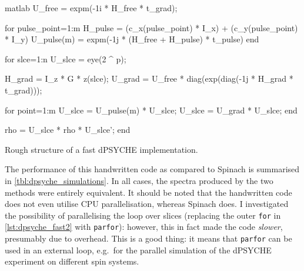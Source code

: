 \begin{mylisting}[htb]
    \centering
\begin{tcbminted}{matlab}
U_free = expm(-1i * H_free * t_grad);

for pulse_point=1:m
    H_pulse = (c_x(pulse_point) * I_x) + (c_y(pulse_point) * I_y)
    U_pulse(m) = expm(-1j * (H_free + H_pulse) * t_pulse)
end

for slce=1:n
    U_slce = eye(2 ^ p);

    H_grad = I_z * G * z(slce);
    U_grad = U_free * diag(exp(diag(-1j * H_grad * t_grad)));

    for point=1:m
        U_slce = U_pulse(m) * U_slce;
        U_slce = U_grad * U_slce;
    end

    rho = U_slce * rho * U_slce';
end
\end{tcbminted}
\caption[Fast dPSYCHE code]{Rough structure of a fast dPSYCHE implementation.}
\label{lst:dpsyche_fast2}
\end{mylisting}

The performance of this handwritten code as compared to Spinach is summarised in \cref{tbl:dpsyche_simulations}.
In all cases, the spectra produced by the two methods were entirely equivalent.
It should be noted that the handwritten code does not even utilise CPU parallelisation, whereas Spinach does.
I investigated the possibility of parallelising the loop over slices (replacing the outer \texttt{for} in \cref{lst:dpsyche_fast2} with \texttt{parfor}): however, this in fact made the code \textit{slower}, presumably due to overhead.
This is a good thing: it means that \texttt{parfor} can be used in an external loop, e.g.\ for the parallel simulation of the dPSYCHE experiment on different spin systems.

